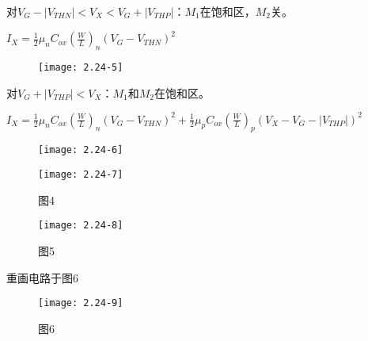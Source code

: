 对$V_G-|V_{THN}|<V_X<V_G+|V_{THP}|$：$M_1$在饱和区，$M_2$关。

$I_X=\frac{1}{2}\mu_nC_{ox}(\frac{W}{L})_n(V_G-V_{THN})^2$

\begin{figure}[H] %
	\begin{minipage}{\linewidth}
		\texttt{[image: 2.24-5]}
	\end{minipage}
\end{figure}

对$V_G+|V_{THP}|<V_X$：$M_1$和$M_2$在饱和区。

$I_X=\frac{1}{2}\mu_nC_{ox}(\frac{W}{L})_n(V_G-V_{THN})^2+\frac{1}{2}\mu_pC_{ox}(\frac{W}{L})_p(V_{X}-V_G-|V_{THP}|)^2$

\begin{figure}[H] %
	\begin{minipage}{\linewidth}
		\texttt{[image: 2.24-6]}
	\end{minipage}
\end{figure}

		\begin{figure}[H] %
	\begin{minipage}{\linewidth}
		\texttt{[image: 2.24-7]}
	\end{minipage}
	\caption*{图4} %
\end{figure}

		\begin{figure}[H] %
	\begin{minipage}{\linewidth}
		\texttt{[image: 2.24-8]}
	\end{minipage}
	\caption*{图5} %
\end{figure}

\scalebox{3}{（b）}

重画电路于图6

\begin{figure}[H] %
	\begin{minipage}{\linewidth}
		\texttt{[image: 2.24-9]}
	\end{minipage}
	\caption*{图6} %
\end{figure}

\scalebox{2}{（1）}

